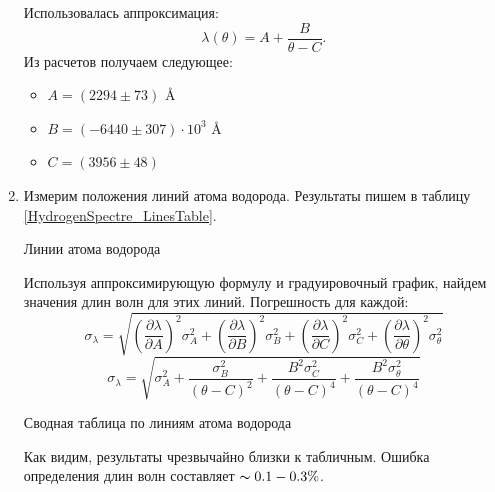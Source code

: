 \documentclass[12pt,a4paper]{article}
\begin{document}
\begin{enumerate}
    Использовалась аппроксимация:
    \begin{equation*}
        \lambda(\theta) = A + \frac{B}{\theta - C}.
    \end{equation*}
    Из расчетов получаем следующее:
    \begin{itemize}
        \item $A = (2294 \pm 73)$ \AA
        
        \item $B = (-6440 \pm 307) \cdot 10^3$ \AA
        
        \item $C = (3956 \pm 48)$
        
    \end{itemize}
    
    \item Измерим положения линий атома водорода. Результаты пишем в таблицу \ref{HydrogenSpectre_LinesTable}.

    \begin{table}[h!]
       \centering
       \footnotesize
       
       \caption{Линии атома водорода}
       \label{HydrogenSpectre_LinesTable}
    \end{table}

	Используя аппроксимирующую формулу и градуировочный график, найдем значения длин волн для этих линий. Погрешность для каждой:
	\begin{equation*}
		\sigma_\lambda = \sqrt{\left(\frac{\partial \lambda}{\partial A}\right)^2 \sigma_A ^2 + \left(\frac{\partial \lambda}{\partial B}\right)^2 \sigma_B ^2 + \left(\frac{\partial \lambda}{\partial C}\right)^2 \sigma_C ^2 + \left(\frac{\partial \lambda}{\partial \theta}\right)^2 \sigma_\theta ^2}
	\end{equation*}
	\begin{equation*}
		\sigma_{\lambda} = \sqrt{\sigma_A^2 + \frac{\sigma_B^2}{(\theta - C)^2} + \frac{B^2 \sigma_C^2}{(\theta - C)^4} + \frac{B^2 \sigma_\theta^2}{(\theta - C)^4}}
	\end{equation*}

    \begin{table}[h!]
       \centering
       \footnotesize
       
       \caption{Сводная таблица по линиям атома водорода}
       \label{tab:t3}
    \end{table}

	Как видим, результаты чрезвычайно близки к табличным. Ошибка определения длин волн составляет $\thicksim 0.1-0.3\%$.


\end{enumerate}
\end{document}
